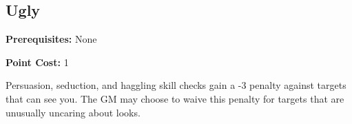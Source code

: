 \subsection*{Ugly}\label{disadvantage:ugly}

\noindent
\textbf{Prerequisites:} None

\noindent
\textbf{Point Cost:} 1 

Persuasion, seduction, and haggling skill checks gain a -3 penalty against
targets that can see you. The GM may choose to waive this penalty for targets
that are unusually uncaring about looks.
